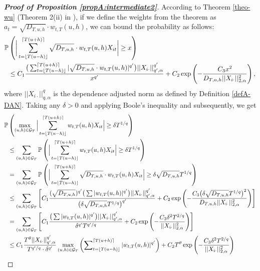 \documentclass[a4paper,12pt]{article}
\makeatletter
\renewcommand{\eqref}[1]{\tagform@{\ref{#1}}}
\makeatother
\begin{document}
\begin{proof}[\textnormal{\textbf{Proof of Proposition \ref{propA:intermediate2}}}]
According to Theorem \ref{theo-wu} (Theorem 2(ii) in \cite{Wu2016}), if we define the weights from the theorem as $a_t = \sqrt{D_{T, u, h}}\cdot w_{t,T}(u,h)$, we can bound the probability as follows:
\begin{align}\label{ineq-diff-8}
\begin{split}
\mathbb{P}&\left(\bigg| \sum_{t=\lfloor T(u-h) \rfloor}^{\lceil T(u+h) \rceil} \sqrt{D_{T, u, h}}\cdot w_{t,T}(u,h)X_{it}  \bigg| \geq x\right) \\
&\leq C_1 \frac{\big( \sum_{t=\lfloor T(u-h) \rfloor}^{\lceil T(u+h) \rceil} |\sqrt{D_{T, u, h}}\cdot w_{t,T}(u,h)|^{q^\prime}\big) ||X_{i\cdot}||^{q^\prime}_{q^\prime, \alpha}}{ x^{q^\prime}} + C_2 \exp \left(-\frac{C_3  x^2}{D_{T, u, h}||X_{i\cdot}||^{2}_{2, \alpha}}\right),
\end{split}
\end{align}
where $||X_{i\cdot}||^{q}_{q, \alpha}$ is the dependence adjusted norm as defined by Definition \ref{defA-DAN}. Taking any $\delta>0$ and applying Boole's inequality and \eqref{ineq-diff-8} subsequently, we get
{\color{black}\begin{align*}
\pr&\left(\max_{(u, h) \in \mathcal{G}_T} \Big| \sum_{t=\lfloor T(u-h) \rfloor}^{\lceil T(u+h) \rceil} w_{t,T}(u,h)X_{it}  \Big| \geq \delta T^{1/q} \right) \\
&\leq \sum_{(u, h) \in \mathcal{G}_T} \pr \left( \Big| \sum_{t=\lfloor T(u-h) \rfloor}^{\lceil T(u+h) \rceil} w_{t,T}(u,h)X_{it}  \Big| \geq \delta T^{1/q} \right) \\
&= \sum_{(u, h) \in \mathcal{G}_T} \pr \left( \Big| \sum_{t=\lfloor T(u-h) \rfloor}^{\lceil T(u+h) \rceil} \sqrt{D_{T, u, h}}\cdot w_{t,T}(u,h)X_{it}  \Big| \geq \delta\sqrt{D_{T, u, h}}T^{1/q}  \right)  \\
&\leq \sum_{(u, h) \in \mathcal{G}_T} \left[C_1 \frac{(\sqrt{D_{T, u, h}})^{q^\prime}\big( \sum |w_{t,T}(u,h)|^{q^\prime}\big) ||X_{i\cdot}||^{q^\prime}_{q^\prime, \alpha}}{ \big(\delta\sqrt{D_{T, u, h}}T^{1/q}\big)^{q^\prime}} + C_2 \exp \left(-\frac{C_3 \big(\delta\sqrt{D_{T, u, h}}T^{1/q} \big)^2}{D_{T, u, h}||X_{i\cdot}||^{2}_{2, \alpha}}\right) \right] \\
&= \sum_{(u, h) \in \mathcal{G}_T} \left[C_1 \frac{\big( \sum |w_{t,T}(u,h)|^{q^\prime}\big) ||X_{i\cdot}||^{q^\prime}_{q^\prime, \alpha}}{\delta^{q^\prime}T^{q^\prime/q} } + C_2 \exp \left(-\frac{C_3 \delta^2 T^{2/q} }{||X_{i\cdot}||^{2}_{2, \alpha}}\right) \right] \\
&\leq C_1 \frac{ T^\theta ||X_{i\cdot}||^{q^\prime}_{q^\prime, \alpha}}{T^{q^\prime/q}\cdot \delta^{q^\prime}} \max_{(u, h) \in \mathcal{G}_T} \left( \sum\nolimits_{t=\lfloor T(u-h) \rfloor}^{\lceil T(u+h) \rceil} |w_{t,T}(u,h)|^{q^\prime}\right)+ C_2 T^\theta \exp \left(-\frac{C_3 \delta^2 T^{2/q}}{||X_{i\cdot}||^{2}_{2, \alpha}}\right) \\

\end{align*}}
\end{proof}
\end{document}
